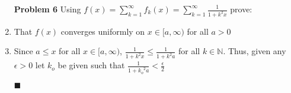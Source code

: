 \documentclass[a4paper,12pt]{report}
\newcommand{\bb}[1]{\mathbb{#1}}
\newcommand{\problem}[3]{
	\begin{enumerate}
		\item[\bf{Problem #1}] #2 
		#3
	\end{enumerate}
}
\newcommand{\subproof}[3]{
	\item[#1] #2
	\item[\bf{Proof:}] 
	#3 
	\begin{flushright}
		$\blacksquare$
	\end{flushright}
}
\begin{document}
\problem{6}{
	Using $f(x) = \sum\limits_{k=1}^{\infty}f_{k}(x) = \sum\limits_{k=1}^{\infty}\frac{1}{1 + k^2 x}$ prove:
}{
	\subproof{(a)}{
		That $f(x)$ converges uniformly on $x \in [a,\infty)$ for all $a>0$
	}{
		Since $a \leqslant x$ for all $x \in [a,\infty)$, $\frac{1}{1+k^2 x} \leqslant \frac{1}{1+k^2 a}$ for all $k \in \bb{N}$. Thus, given any $\epsilon > 0$ let $k_o$ be given such that $\frac{1}{1+{k_o}^2 a} < \frac{\epsilon}{2}$
	}
}
\end{document}
